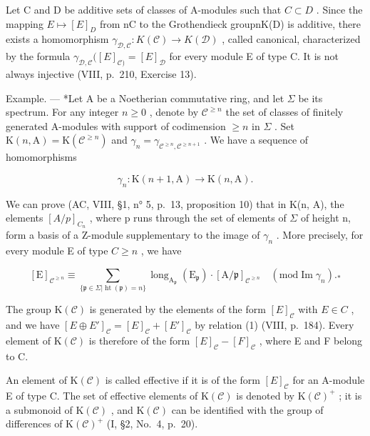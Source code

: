 Let C and D be additive sets of classes of A-modules such that \(C \subset D\) . Since the mapping \(E \mapsto [E]_{D}\) from nC to the Grothendieck groupnK(D) is additive, there exists a homomorphism \(\gamma_{\mathcal{D},\mathcal{C}} : K(\mathcal{C}) \to K(\mathcal{D})\) , called canonical, characterized by the formula \(\gamma_{\mathcal{D},\mathcal{C}}([E]_{\mathcal{C})} = [E]_{\mathcal{D}}\) for every module E of type C. It is not always injective (VIII, p.~210, Exercise 13).

Example. --- *Let A be a Noetherian commutative ring, and let \(\Sigma\) be its spectrum. For any integer \(n \geqslant 0\) , denote by \(\mathcal{C}^{\geqslant n}\) the set of classes of finitely generated A-modules with support of codimension \(\geqslant n\) in \(\Sigma\) . Set \(\mathrm{K}(n,\mathrm{A}) = \mathrm{K}(\mathcal{C}^{\geqslant n})\) and \(\gamma_{n} = \gamma_{\mathcal{C}^{\geqslant n},\mathcal{C}^{\geqslant n + 1}}\) . We have a sequence of homomorphisms

\[
\gamma_ {n}: \mathrm{K} (n + 1, \mathrm{A}) \longrightarrow \mathrm{K} (n, \mathrm{A}).
\]

We can prove (AC, VIII, §1, n° 5, p.~13, proposition 10) that in K(n, A), the elements \([A/p]_{C_{n}}\) , where p runs through the set of elements of \(\Sigma\) of height n, form a basis of a Z-module supplementary to the image of \(\gamma_{n}\) . More precisely, for every module E of type \(C \geqslant n\) , we have

\[
[ \mathrm{E} ] _ {\mathcal {C} ^ {\geqslant n}} \equiv \sum_ {\{\mathfrak {p} \in \Sigma | \operatorname{ht} (\mathfrak {p}) = n \}} \operatorname{long} _ {\mathrm{A} _ {\mathfrak {p}}} (\mathrm{E} _ {\mathfrak {p}}) \cdot [ \mathrm{A} / \mathfrak {p} ] _ {\mathcal {C} ^ {\geqslant n}} \quad (\mathrm{mod} \operatorname{Im} \gamma_ {n}). _ {*}
\]

The group \(\mathrm{K}(\mathcal{C})\) is generated by the elements of the form \([E]_{\mathcal{C}}\) with \(E \in C\) , and we have \([E \oplus E']_{\mathcal{C}} = [E]_{\mathcal{C}} + [E']_{\mathcal{C}}\) by relation (1) (VIII, p.~184). Every element of \(\mathrm{K}(\mathcal{C})\) is therefore of the form \([E]_{\mathcal{C}} - [F]_{\mathcal{C}}\) , where E and F belong to C.

An element of \(\mathrm{K}(\mathcal{C})\) is called effective if it is of the form \([E]_{\mathcal{C}}\) for an A-module E of type C. The set of effective elements of \(\mathrm{K}(\mathcal{C})\) is denoted by \(\mathrm{K}(\mathcal{C})^{+}\) ; it is a submonoid of \(\mathrm{K}(\mathcal{C})\) , and \(\mathrm{K}(\mathcal{C})\) can be identified with the group of differences of \(\mathrm{K}(\mathcal{C})^{+}\) (I, §2, No.~4, p.~20).

